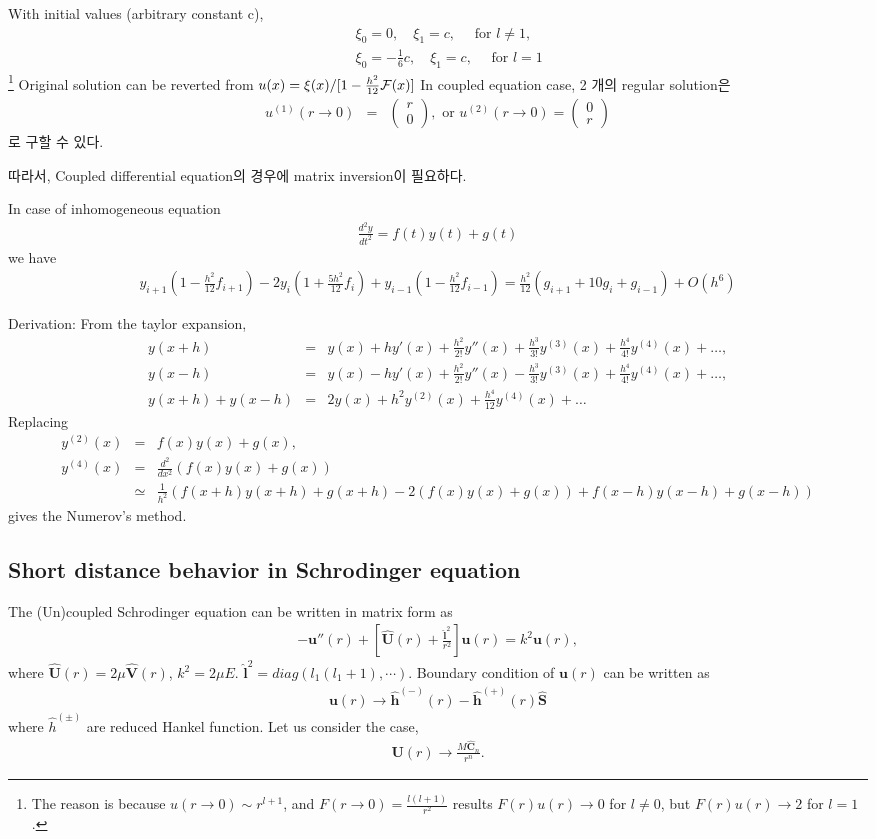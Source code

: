 \documentclass[10pt]{book}
\def\bm{\boldsymbol}
\newcommand{\bea}{\begin{eqnarray}}
\newcommand{\eea}{\end{eqnarray}}
\newcommand{\no}{\nonumber \\}
\begin{document}
With initial values (arbitrary constant c),
\bea 
& &\xi_0=0,\quad \xi_1=c,\quad \mbox{ for }l\neq 1, \no 
& &\xi_0=-\frac{1}{6}c,\quad  \xi_1=c,\quad \mbox{ for }l = 1
\eea 
\footnote{
The reason is because $u(r\to 0)\sim r^{l+1}$, and $F(r\to 0)=\frac{l(l+1)}{r^2}$
results $F(r)u(r)\to 0$ for $l\neq 0$, but $F(r)u(r)\to 2$ for $l=1$. 
} 
Original solution can be reverted from $u(x)=\xi(x)/[1-\frac{h^2}{12}{\cal F}(x)]$
In coupled equation case, 2 개의 regular solution은  
\bea
u^{(1)}(r\to 0)&=&\left(\begin{array}{c} r\\ 0 \end{array}\right), \mbox{ or }
  u^{(2)}(r\to 0)=\left(\begin{array}{c} 0\\ r \end{array}\right)
\eea
로 구할 수 있다.

따라서, Coupled differential equation의 경우에 matrix inversion이 필요하다. 

In case of inhomogeneous equation
\bea 
\frac{d^2 y}{dt^2}= f(t) y(t)+g(t)  
\eea 
we have 
\bea 
y_{i+1}(1-\frac{h^2}{12}f_{i+1})-2 y_{i}(1+\frac{5 h^2}{12}f_i)
+y_{i-1}(1-\frac{h^2}{12}f_{i-1})=\frac{h^2}{12}(g_{i+1}+10 g_i+g_{i-1})+O(h^6)
\eea 

Derivation:
From the taylor expansion,
\bea 
y(x+h)&=&y(x)+h y'(x)+\frac{h^2}{2!}y''(x)
    +\frac{h^3}{3!}y^{(3)}(x)+\frac{h^4}{4!}y^{(4)}(x)+\dots,\no 
y(x-h)&=&y(x)-h y'(x)+\frac{h^2}{2!}y''(x)
        -\frac{h^3}{3!}y^{(3)}(x)+\frac{h^4}{4!}y^{(4)}(x)+\dots,\no 
y(x+h)+y(x-h)&=&2 y(x)+ h^2 y^{(2)}(x)+\frac{h^4}{12}y^{(4)}(x)+\dots        
\eea 
Replacing
\bea 
y^{(2)}(x)&=& f(x)y(x)+g(x),\no 
y^{(4)}(x)&=& \frac{d^2}{dx^2}(f(x)y(x)+g(x))\no 
      &\simeq& \frac{1}{h^2}(f(x+h)y(x+h)+g(x+h)-2(f(x)y(x)+g(x))+f(x-h)y(x-h)+g(x-h))  
\eea 
gives the Numerov's method. 


\subsection{Short distance behavior in Schrodinger equation }
The (Un)coupled Schrodinger equation can be written in 
matrix form as
\bea
-{\bm u}''(r)+\left[\hat{\bm U}(r)+\frac{\hat{\bm l}^2}{r^2}\right]
{\bm u}(r)=k^2{\bm u}(r),
\eea
where $\hat{\bm U}(r)=2\mu\hat{\bm V}(r)$,
$k^2=2\mu E$. $\hat{\bm l}^2=diag(l_1(l_1+1),\cdots)$.
Boundary condition of ${\bm u}(r)$ can be written as
\bea
{\bm u}(r)\rightarrow \hat{\bm h}^{(-)}(r)
                     -\hat{\bm h}^{(+)}(r)\hat{\bm S}
\eea
where $\hat{h}^{(\pm)}$ are reduced Hankel function.
Let us consider the case,
\bea
{\bm U}(r)\to \frac{M \hat{\bm C}_n}{r^n}.
\eea
\end{document}
